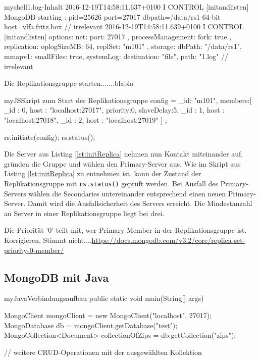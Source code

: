 \begin{listingsboxShell}[label={lst:X}]{myshell}{1.log-Inhalt}
2016-12-19T14:58:11.637+0100 I CONTROL  [initandlisten] MongoDB starting :
pid=25626 port=27017 dbpath=/data/rs1 64-bit host=vlfa.fritz.box
// irrelevant
2016-12-19T14:58:11.639+0100 I CONTROL  [initandlisten] options:
{ net: { port: 27017 }, processManagement: { fork: true }, replication:
{ oplogSizeMB: 64, replSet: "m101" }, storage: { dbPath: "/data/rs1",
mmapv1: {smallFiles: true}}, systemLog: {destination: "file", path: "1.log"}}
// irrelevant
\end{listingsboxShell}
Die Replikationsgruppe starten.......blabla
\begin{listingsboxJavaScript}[label={lst:initReplica}]{myJS}{Skript zum Start der Replikationsgruppe}
config = { _id: "m101", members:[
          { _id : 0, host : "localhost:27017", priority:0, slaveDelay:5},
          { _id : 1, host : "localhost:27018"},
          { _id : 2, host : "localhost:27019"} ]
};

rs.initiate(config);
rs.status();
\end{listingsboxJavaScript}

Die Server aus Listing \ref{lst:initReplica} nehmen nun Kontakt miteinander auf, gründen die Gruppe und wählen den Primary-Server aus. Wie im Skript aus Listing 	\ref{lst:initReplica} zu entnehmen ist, kann der Zustand der Replikationsgruppe mit \texttt{rs.status()} geprüft werden. Bei Ausfall des Primary-Servers wählen die Secondaries untereinander entsprechend einen neuen Primary-Server. Damit wird die Ausfallsicherheit des Servers erreicht. Die Mindestanzahl an Server in einer Replikationsgruppe liegt bei drei. 


Die Priorität '0' teilt mit, wer Primary Member in der Replikationsgruppe ist. Korrigieren, Stimmt nicht....\url{https://docs.mongodb.com/v3.2/core/replica-set-priority-0-member/}

\subsection{MongoDB mit Java}

\begin{listingsboxJava}[label={lst:conn}]{myJava}{Verbindungsaufbau}
public static void main(String[] args) {

	MongoClient mongoClient = new MongoClient("localhost", 27017);
        MongoDatabase db = mongoClient.getDatabase("test");
        MongoCollection<Document> collectionOfZips = db.getCollection("zips");
        
        // weitere CRUD-Operationen mit der ausgewählten Kollektion
}
\end{listingsboxJava}

